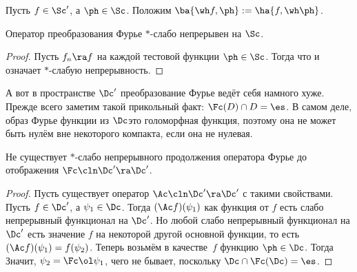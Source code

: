 \documentclass[a4paper]{article}
\newcommand{\dx}{\,dx}
\begin{document}
\begin{df}
Пусть $f\in \Sc'$, а $\ph\in \Sc$. Положим $\ba{\wh f, \ph} := \ha{f, \wh \ph}$.
\end{df}

\begin{stm}
Оператор преобразования Фурье $*$-слабо непрерывен на $\Sc$.
\end{stm}
\begin{proof}
Пусть $f_n\ra f$ на каждой тестовой функции $\ph\in\Sc$. Тогда
что и означает $*$-слабую непрерывность.
\end{proof}

А вот в пространстве $\Dc'$ преобразование Фурье ведёт себя намного хуже. Прежде всего заметим такой прикольный факт:
$\Fc(D) \cap D = \es$. В самом деле, образ Фурье функции из $\Dc$\т это голоморфная функция, поэтому
она не может быть нулём вне некоторого компакта, если она не нулевая.

\begin{stm}
Не существует $*$-слабо непрерывного продолжения оператора Фурье до отображения $\Fc\cln \Dc'\ra\Dc'$.
\end{stm}
\begin{proof}
Пусть существует оператор $\Ac\cln \Dc'\ra\Dc'$ с такими свойствами. Пусть $f\in \Dc'$, а $\psi_1\in \Dc$.
Тогда $(\Ac f)(\psi_1)$ как функция от $f$ есть слабо непрерывный функционал на $\Dc'$. Но любой слабо непрерывный
функционал на $\Dc'$ есть значение $f$ на некоторой другой основной функции, то есть
$(\Ac f)(\psi_1) = f(\psi_2)$. Теперь возьмём в качестве~$f$ функцию $\ph\in\Dc$. Тогда
\eqn{\int  \psi_2\ph\dx = \int \ol{\ol\psi}_1\Fc\ph\dx = \int \Fc\ol\psi_1\ph\dx.}
Значит, $\psi_2=\Fc\ol\psi_1$, чего не бывает, поскольку $\Dc\cap \Fc(\Dc)=\es$.
\end{proof}
\end{document}
